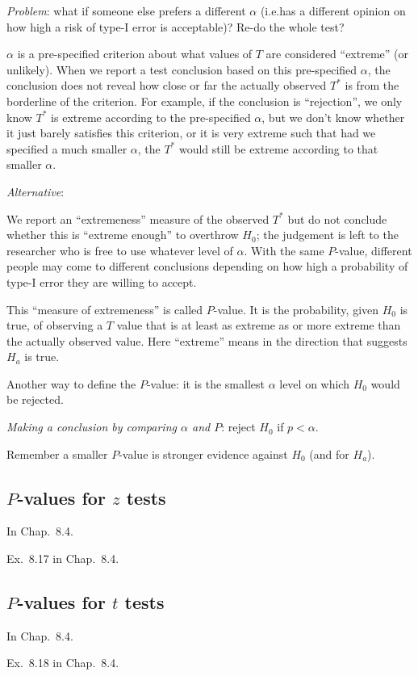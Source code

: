 \documentclass[12pt]{article}
\begin{document}
\emph{Problem}:
what if someone else prefers a different $\alpha$ (i.e.\@ has
a different opinion on how high a risk of type-I error is acceptable)?
Re-do the whole test?

$\alpha$ is a pre-specified criterion about
what values of $T$ are considered ``extreme'' (or unlikely).
When we report a test conclusion based on this pre-specified $\alpha$,
the conclusion does not reveal how close or far the actually observed
$T^*$ is from the borderline of the criterion.
For example,
if the conclusion is ``rejection'',
we only know $T^*$ is extreme according to the pre-specified $\alpha$,
but we don't know whether it just barely satisfies this criterion,
or it is very extreme such that had we specified a much smaller
$\alpha$, the $T^*$ would still be extreme according to that smaller $\alpha$.

\emph{Alternative}:

We report an ``extremeness'' measure of the observed $T^*$ but do not
conclude whether this is ``extreme enough'' to overthrow $H_0$;
the judgement is left to the
researcher who is free to use whatever level of $\alpha$.
With the same $P$-value,
different people may come to different conclusions
depending on how high a probability of type-I error they are willing to
accept.

This ``measure of extremeness'' is called $P$-value.
It is the probability, given $H_0$ is true,
of observing a $T$ value that is
at least as extreme as or more extreme than
the actually observed value.
Here ``extreme'' means in the direction that suggests $H_a$ is true.

Another way to define the $P$-value:
it is the smallest $\alpha$ level on which $H_0$ would be rejected.

\emph{Making a conclusion by comparing $\alpha$ and $P$}:
reject $H_0$ if $p < \alpha$.

Remember a smaller $P$-value is stronger evidence against
$H_0$ (and for $H_a$).

\subsection{$P$-values for $z$ tests}

In Chap.~8.4.


\example
Ex.~8.17 in Chap.~8.4.

\subsection{$P$-values for $t$ tests}

In Chap.~8.4.

\example
Ex.~8.18 in Chap.~8.4.
\end{document}
